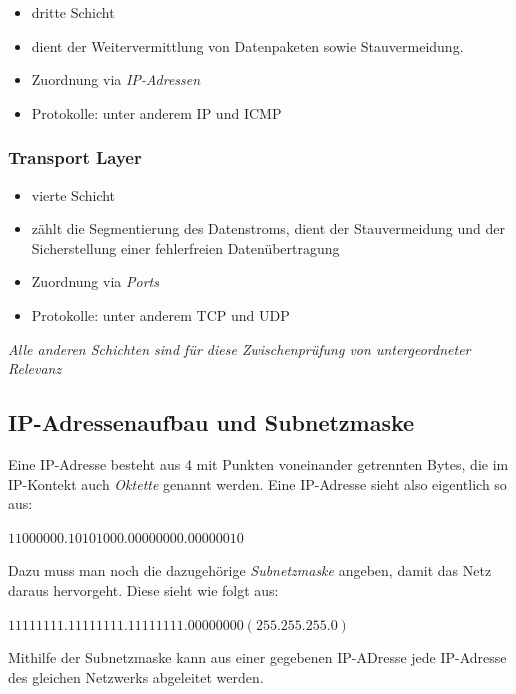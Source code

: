 \documentclass[a4paper, 12pt]{report}
\begin{document}
\begin{multicols}{2}
\begin{itemize}
    \item dritte Schicht
    \item dient der Weitervermittlung von Datenpaketen sowie Stauvermeidung.
    \item Zuordnung via \emph{IP-Adressen}
    \item Protokolle: unter anderem IP und ICMP
\end{itemize}

\subsubsection{Transport Layer}

\begin{itemize}
    \item vierte Schicht
    \item zählt die Segmentierung des Datenstroms, dient der Stauvermeidung und
	der Sicherstellung einer fehlerfreien Datenübertragung
    \item Zuordnung via \emph{Ports}
    \item Protokolle: unter anderem TCP und UDP
\end{itemize}

\emph{Alle anderen Schichten sind für diese Zwischenprüfung von untergeordneter
Relevanz}

\subsection{IP-Adressenaufbau und Subnetzmaske}

Eine IP-Adresse besteht aus 4 mit Punkten voneinander getrennten Bytes, die im
IP-Kontekt auch \emph{Oktette} genannt werden. Eine IP-Adresse sieht also
eigentlich so aus: \\

\begin{center}
$11000000.10101000.00000000.00000010$
\end{center}

Dazu muss man noch die dazugehörige \emph{Subnetzmaske} angeben, damit das Netz
daraus hervorgeht. Diese sieht wie folgt aus: \\

\begin{center}
    $11111111.11111111.11111111.00000000 (255.255.255.0)$
\end{center}

Mithilfe der Subnetzmaske kann aus einer gegebenen IP-ADresse jede IP-Adresse
des gleichen Netzwerks abgeleitet werden. \\


\end{multicols}
\end{document}
